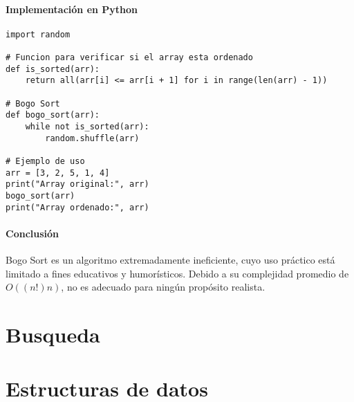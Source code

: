 \documentclass[11pt,openany]{book}
\begin{document}
\subsubsection{Implementación en Python}
\lstset{language=Python}
\begin{lstlisting}
import random

# Funcion para verificar si el array esta ordenado
def is_sorted(arr):
    return all(arr[i] <= arr[i + 1] for i in range(len(arr) - 1))

# Bogo Sort
def bogo_sort(arr):
    while not is_sorted(arr):
        random.shuffle(arr)

# Ejemplo de uso
arr = [3, 2, 5, 1, 4]
print("Array original:", arr)
bogo_sort(arr)
print("Array ordenado:", arr)
\end{lstlisting}

\subsubsection{Conclusión}
Bogo Sort es un algoritmo extremadamente ineficiente, cuyo uso práctico está limitado a fines educativos y humorísticos. Debido a su complejidad promedio de $O((n!)n)$, no es adecuado para ningún propósito realista.


\printnotes*


\chapter{Busqueda}


\printnotes*

\chapter{Estructuras de datos}


\printnotes*
\end{document}
